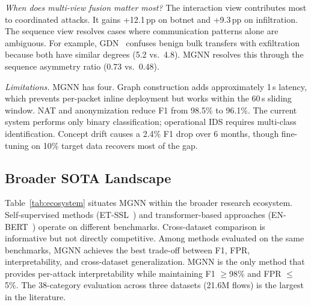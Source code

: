 \documentclass[conference]{IEEEtran}
\begin{document}
\textit{When does multi-view fusion matter most?} The interaction view contributes most to coordinated attacks. It gains +12.1\,pp on botnet and +9.3\,pp on infiltration. The sequence view resolves cases where communication patterns alone are ambiguous. For example, GDN~\cite{zheng2022gdn} confuses benign bulk transfers with exfiltration because both have similar degrees (5.2 vs.\ 4.8). MGNN resolves this through the sequence asymmetry ratio (0.73 vs.\ 0.48).

\textit{Limitations.} MGNN has four. Graph construction adds approximately 1\,s latency, which prevents per-packet inline deployment but works within the 60\,s sliding window. NAT and anonymization reduce F1 from 98.5\% to 96.1\%. The current system performs only binary classification; operational IDS requires multi-class identification. Concept drift causes a 2.4\% F1 drop over 6 months, though fine-tuning on 10\% target data recovers most of the gap.

\subsection{Broader SOTA Landscape}
Table~\ref{tab:ecosystem} situates MGNN within the broader research ecosystem. Self-supervised methods (ET-SSL~\cite{sattar2025etssl}) and transformer-based approaches (EN-BERT~\cite{liu2025enbert}) operate on different benchmarks. Cross-dataset comparison is informative but not directly competitive. Among methods evaluated on the same benchmarks, MGNN achieves the best trade-off between F1, FPR, interpretability, and cross-dataset generalization. MGNN is the only method that provides per-attack interpretability while maintaining F1 $\ge$98\% and FPR $\le$5\%. The 38-category evaluation across three datasets (21.6M flows) is the largest in the literature.
\end{document}
